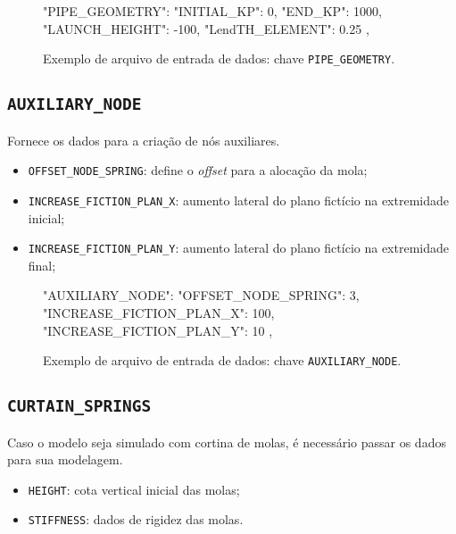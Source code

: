 \begin{figure}
\caption{Exemplo de arquivo de entrada de dados: chave \texttt{PIPE\_GEOMETRY}.\label{lst:pipe-geometry}}
\begin{jsoncode}
{
  "PIPE_GEOMETRY": {
    "INITIAL_KP": 0,
    "END_KP": 1000,
    "LAUNCH_HEIGHT": -100,
    "LendTH_ELEMENT": 0.25
  },
}
\end{jsoncode}
\end{figure}

\subsection{\texttt{AUXILIARY\_NODE}}

Fornece os dados para a criação de nós auxiliares.

\begin{itemize}
  \item \texttt{OFFSET\_NODE\_SPRING}: define o \textit{offset} para a alocação da mola;
  \item \texttt{INCREASE\_FICTION\_PLAN\_X}: aumento lateral do plano fictício na extremidade inicial;
  \item \texttt{INCREASE\_FICTION\_PLAN\_Y}: aumento lateral do plano fictício na extremidade final;
\end{itemize}

\begin{figure}
\caption{Exemplo de arquivo de entrada de dados: chave \texttt{AUXILIARY\_NODE}.\label{lst:auxiliary-node}}
\begin{jsoncode}
{
  "AUXILIARY_NODE": {
    "OFFSET_NODE_SPRING": 3,
    "INCREASE_FICTION_PLAN_X": 100,
    "INCREASE_FICTION_PLAN_Y": 10
  },
}
\end{jsoncode}
\end{figure}

\subsection{\texttt{CURTAIN\_SPRINGS}}

Caso o modelo seja simulado com cortina de molas, é necessário passar os dados para sua modelagem.

\begin{itemize}
  \item \texttt{HEIGHT}: cota vertical inicial das molas;
  \item \texttt{STIFFNESS}: dados de rigidez das molas.
\end{itemize}

